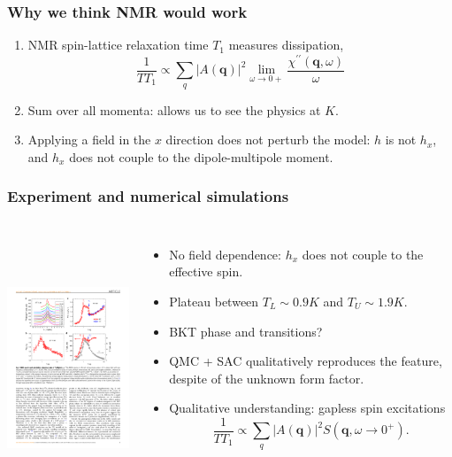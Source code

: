 \documentclass[xcolor=table, aspectratio=1610,ignorenonframetext]{beamer}
\begin{document}
\begin{frame}
  \frametitle{Why we think NMR would work}
  \begin{enumerate}
    \item NMR spin-lattice relaxation time $T_1$ measures dissipation,
    \[\frac1{TT_1}\propto \sum_q|A(\bm q)|^2\lim_{\omega\rightarrow0+}
    \frac{\chi^{\prime\prime}(\bm{q}, \omega)}\omega\]
    \item Sum over all momenta: allows us to see the physics at $K$.
    \item Applying a field in the $x$ direction does not perturb the model:
    $h$ is not $h_x$, and $h_x$ does not couple to the dipole-multipole moment.
  \end{enumerate}
\end{frame}

\begin{frame}
  \frametitle{Experiment and numerical simulations}
  \begin{columns}
    \includegraphics[height=8cm]{nmr}
    \begin{itemize}
      \item No field dependence: $h_x$ does not couple to the effective spin.
      \item Plateau between $T_L\sim 0.9K$ and $T_U\sim1.9K$.
      \item BKT phase and transitions?
      \item QMC + SAC qualitatively reproduces the feature, despite of the unknown form factor.
      \item Qualitative understanding: gapless spin excitations
      {\small\[\frac1{TT_1}\propto \sum_q|A(\bm q)|^2S(\bm q, \omega\rightarrow0^+).\]}

\end{itemize}
\end{columns}
\end{frame}
\end{document}
